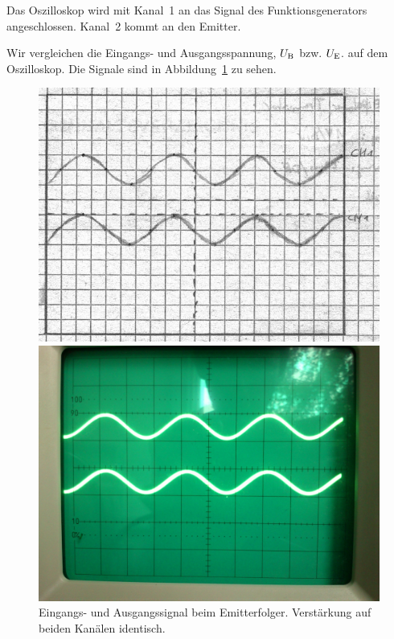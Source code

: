 Das Oszilloskop wird mit Kanal~1 an das Signal des Funktionsgenerators
angeschlossen. Kanal~2 kommt an den Emitter.

Wir vergleichen die Eingangs- und Ausgangsspannung, $U_\text{B}$ bzw. $U_\text{E}$. auf dem
Oszilloskop. Die Signale sind in Abbildung~\ref{fig:7} zu sehen.

\begin{figure}
	\centering
	\begin{minipage}{.45\linewidth}
		\includegraphics[width=\linewidth]{Oszi_Hand/3-07.jpg}
	\end{minipage}
	\hfill
	\begin{minipage}{.45\linewidth}
		\includegraphics[width=\linewidth]{Oszi_Foto/3-07.jpg}
	\end{minipage}
	\caption{%
		Eingangs- und Ausgangssignal beim Emitterfolger. Verstärkung auf beiden
	Kanälen identisch.
	}
	\label{fig:7}
\end{figure}

